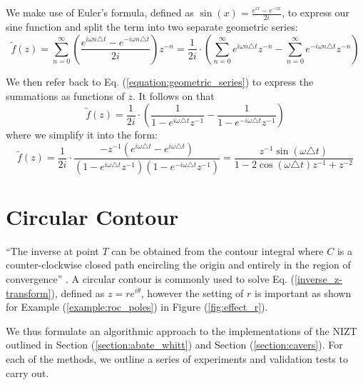 \documentclass[a4paper]{report}
\begin{document}
We make use of Euler's formula, defined as $\sin(x) = \frac{e^{ix} - e^{-ix}}{2i}$, to express our sine function and split the term into two separate geometric series:
\begin{equation}
	\tilde{f}(z) = \sum^{\infty}_{n = 0} \left( \frac{e^{i\omega n\triangle t} - e^{-i\omega n\triangle t}}{2i} \right) z^{-n} = \frac{1}{2i}\cdot\left( \sum^{\infty}_{n = 0} e^{i\omega n\triangle t} z^{-n} - \sum^{\infty}_{n = 0} e^{-i\omega n\triangle t}z^{-n}\right)
\end{equation}
 
 We then refer back to Eq. (\ref{equation:geometric_series}) to express the summations as functions of $z$. It follows on that
\begin{equation}
	\tilde{f}(z) = \frac{1}{2i}\cdot \left( \frac{1}{1 - e^{i\omega \triangle t}z^{-1}} - \frac{1}{1 - e^{-i\omega \triangle t}z^{-1}} \right)
\end{equation}
where we simplify it into the form:
\begin{equation}
\tilde{f}(z) = \frac{1}{2i} \cdot \frac{ -z^{-1}(e^{i\omega \triangle t} - e^{i\omega \triangle t})}{(1 - e^{i\omega \triangle t}z^{-1})(1 - e^{-i\omega \triangle t}z^{-1})} = \frac{z^{-1}\sin(\omega \triangle t)}{1 - 2\cos(\omega\triangle t)z^{-1} + z^{-2}}
\end{equation}

\section{Circular Contour}\label{section:circular_contour}
``The inverse at point $T$ can be obtained from the contour integral where $C$ is a counter-clockwise closed path encircling the origin and entirely in the region of convergence'' \citep{horvath2020numerical}. A circular contour is commonly used to solve Eq. (\ref{inverse_z-transform}), defined as $z = re^{i\theta}$, however the setting of $r$ is important as shown for Example (\ref{example:roc_poles}) in Figure (\ref{fig:effect_r}).

We thus formulate an algorithmic approach to the implementations of the NIZT outlined in Section (\ref{section:abate_whitt}) and Section (\ref{section:cavers}). For each of the methods, we outline a series of experiments and validation tests to carry out.
\end{document}

